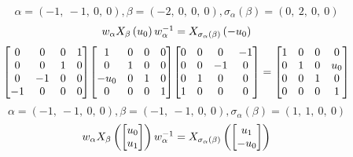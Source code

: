 \documentclass[11pt]{article}
\theoremstyle{definition}
\begin{document}
\[
\alpha = \left( -1, \  -1, \  0, \  0\right), \beta = \left( -2, \  0, \  0, \  0\right), \sigma_{\alpha}(\beta) = \left( 0, \  2, \  0, \  0\right)
\]
\[
\scaletoalign{\textwidth}{w_{\alpha} X_{\beta}\left(u_{0}\right) w_{\alpha}^{-1} = X_{\sigma_{\alpha}\left(\beta\right)}\left(- u_{0}\right)}
\]
\[
\scaletoalign{\textwidth}{{\left[\begin{matrix}0 & 0 & 0 & 1\\0 & 0 & 1 & 0\\0 & -1 & 0 & 0\\-1 & 0 & 0 & 0\end{matrix}\right]} {\left[\begin{matrix}1 & 0 & 0 & 0\\0 & 1 & 0 & 0\\- u_{0} & 0 & 1 & 0\\0 & 0 & 0 & 1\end{matrix}\right]} {\left[\begin{matrix}0 & 0 & 0 & -1\\0 & 0 & -1 & 0\\0 & 1 & 0 & 0\\1 & 0 & 0 & 0\end{matrix}\right]} = {\left[\begin{matrix}1 & 0 & 0 & 0\\0 & 1 & 0 & u_{0}\\0 & 0 & 1 & 0\\0 & 0 & 0 & 1\end{matrix}\right]}}
\]
\[
\alpha = \left( -1, \  -1, \  0, \  0\right), \beta = \left( -1, \  -1, \  0, \  0\right), \sigma_{\alpha}(\beta) = \left( 1, \  1, \  0, \  0\right)
\]
\[
\scaletoalign{\textwidth}{w_{\alpha} X_{\beta}\left(\left[\begin{matrix}u_{0}\\u_{1}\end{matrix}\right]\right) w_{\alpha}^{-1} = X_{\sigma_{\alpha}\left(\beta\right)}\left(\left[\begin{matrix}u_{1}\\- u_{0}\end{matrix}\right]\right)}
\]
\end{document}
